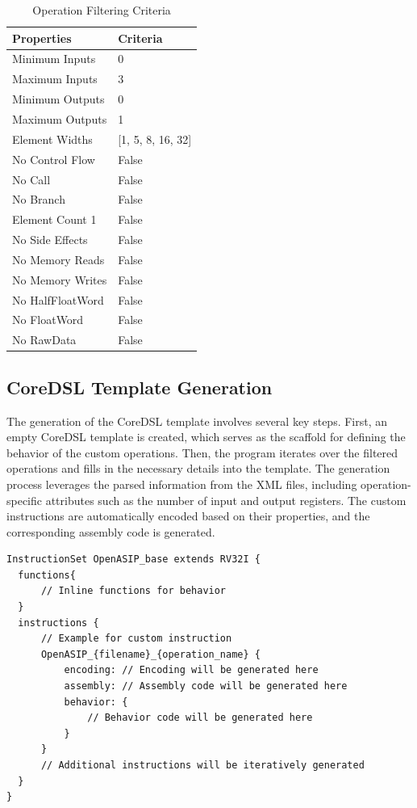 \begin{table}[hb]
    \centering
    \caption{Operation Filtering Criteria}
    \label{tab:filtercriteria}
    \begin{tabular}{@{}ll@{}}
    \toprule
    \textbf{Properties} & \textbf{Criteria} \\ \midrule
    Minimum Inputs & 0 \\
    Maximum Inputs & 3 \\
    Minimum Outputs & 0 \\
    Maximum Outputs & 1 \\
    Element Widths & [1, 5, 8, 16, 32] \\
    No Control Flow & False \\
    No Call & False \\
    No Branch & False \\
    Element Count 1 & False \\
    No Side Effects & False \\
    No Memory Reads & False \\
    No Memory Writes & False \\
    No HalfFloatWord & False \\
    No FloatWord & False \\
    No RawData & False \\ \bottomrule
    \end{tabular}
\end{table}

\subsection{CoreDSL Template Generation}

The generation of the CoreDSL template involves several key steps. First, an empty CoreDSL template is created, which serves as the scaffold for defining the behavior of the custom operations. Then, the program iterates over the filtered operations and fills in the necessary details into the template. The generation process leverages the parsed information from the XML files, including operation-specific attributes such as the number of input and output registers. The custom instructions are automatically encoded based on their properties, and the corresponding assembly code is generated.

\begin{lstlisting}[caption={CoreDSL Template},captionpos=b]
InstructionSet OpenASIP_base extends RV32I {
  functions{
      // Inline functions for behavior
  }
  instructions {
      // Example for custom instruction
      OpenASIP_{filename}_{operation_name} {
          encoding: // Encoding will be generated here
          assembly: // Assembly code will be generated here
          behavior: {
              // Behavior code will be generated here
          }
      }
      // Additional instructions will be iteratively generated
  }
}
\end{lstlisting}

